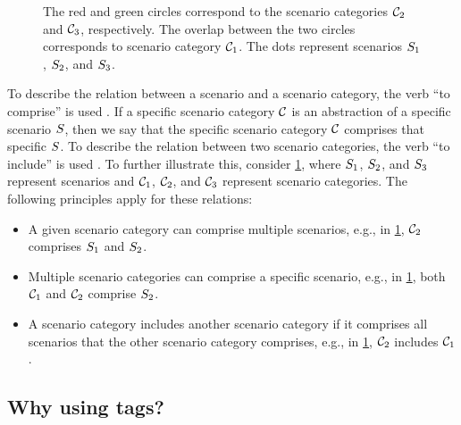 \setlength{\venncircle}{4em}
\begin{figure}[t]
	\centering
	
	\caption{The red and green circles correspond to the scenario categories $\mathcal{C}_{2}$ and $\mathcal{C}_{3}$, respectively. The overlap between the two circles corresponds to scenario category $\mathcal{C}_{1}$. The dots represent scenarios $S_{1}$, $S_{2}$, and $S_{3}$.}
	\label{fig:venn diagram scenario category}
\end{figure}

To describe the relation between a scenario and a scenario category, the verb ``to comprise'' is used \autocite{degelder2020ontology}.
If a specific scenario category $\mathcal{C}$ is an abstraction of a specific scenario $S$, then we say that the specific scenario category $\mathcal{C}$ comprises that specific $S$. 
To describe the relation between two scenario categories, the verb ``to include'' is used \autocite{degelder2020ontology}. 
To further illustrate this, consider \cref{fig:venn diagram scenario category}, where $S_{1}$, $S_{2}$, and $S_{3}$ represent scenarios and $\mathcal{C}_{1}$, $\mathcal{C}_{2}$, and $\mathcal{C}_{3}$ represent scenario categories.
The following principles apply for these relations:
\begin{itemize}
	\item A given scenario category can comprise multiple scenarios, e.g., in \cref{fig:venn diagram scenario category}, $\mathcal{C}_{2}$ comprises $S_{1}$ and $S_{2}$.
	\item Multiple scenario categories can comprise a specific scenario, e.g., in \cref{fig:venn diagram scenario category}, both $\mathcal{C}_{1}$ and $\mathcal{C}_{2}$ comprise $S_{2}$. 
	\item A scenario category includes another scenario category if it comprises all scenarios that the other scenario category comprises, e.g., in \cref{fig:venn diagram scenario category}, $\mathcal{C}_{2}$ includes $\mathcal{C}_{1}$.
\end{itemize}



\subsection{Why using tags?}
\label{sec:tags for scenario catgories}


